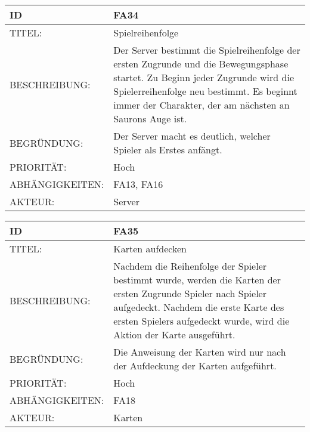 \documentclass{uulm-assignment}
\begin{document}
    \begin{tabularx}{\textwidth}{|l|X |} \hline
        \textbf{ID} & \textbf{FA34} \\
        \hline
        TITEL: & Spielreihenfolge\\
        \hline
        BESCHREIBUNG: & Der Server bestimmt die Spielreihenfolge der ersten Zugrunde und die Bewegungsphase startet. Zu Beginn jeder Zugrunde wird die Spielerreihenfolge neu bestimmt. Es beginnt immer der Charakter,
der am nächsten an Saurons Auge ist.
        \\
        \hline
        BEGRÜNDUNG: & Der Server macht es deutlich, welcher Spieler als Erstes anfängt.\\
        \hline
        PRIORITÄT: & Hoch\\
        \hline
        ABHÄNGIGKEITEN: & FA13, FA16\\
        \hline
        AKTEUR: & Server\\
        \hline
    \end{tabularx}
    
    \begin{tabularx}{\textwidth}{|l|X |} \hline
        \textbf{ID} & \textbf{FA35} \\
        \hline
        TITEL: & Karten aufdecken\\
        \hline
        BESCHREIBUNG: & Nachdem die Reihenfolge der Spieler bestimmt wurde, werden die Karten der ersten Zugrunde Spieler
nach Spieler aufgedeckt. Nachdem die erste Karte des ersten Spielers aufgedeckt wurde, wird die
Aktion der Karte ausgeführt. 
        \\
        \hline
        BEGRÜNDUNG: & Die Anweisung der Karten wird nur nach der Aufdeckung der Karten aufgeführt.\\
        \hline
        PRIORITÄT: & Hoch\\
        \hline
        ABHÄNGIGKEITEN: & FA18\\
        \hline
        AKTEUR: & Karten\\
        \hline
    \end{tabularx}
    
\end{document}
